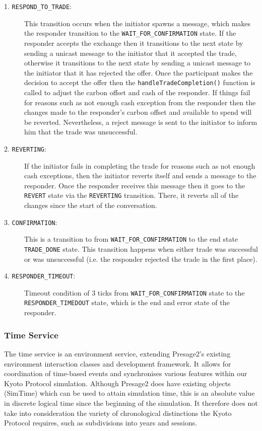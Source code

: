 \begin{description}
	\item[1. \texttt{RESPOND\_TO\_TRADE}:]
	This transition occurs when the initiator spawns a message, which makes the responder transition to the \texttt{WAIT\_FOR\_CONFIRMATION} state. If the responder accepts the exchange then it transitions to the next state by sending a unicast message to the initiator that it accepted the trade, otherwise it transitions to the next state by sending a unicast message to the initiator that it has rejected the offer. Once the participant makes the decision to accept the offer then the \texttt{handleTradeCompletion()} function is called to adjust the carbon offset and cash of the responder. If things fail for reasons such as not enough cash exception from the responder then the changes made to the responder’s carbon offset and available to spend will be reverted. Nevertheless, a reject message is sent to the initiator to inform him that the trade was unsuccessful.
	\item[2. \texttt{REVERTING}:]
	If the initiator fails in completing the trade for reasons such as not enough cash exceptions, then the initiator reverts itself and sends a message to the responder. Once the responder receives this message then it goes to the \texttt{REVERT} state via the \texttt{REVERTING} transition. There, it reverts all of the changes since the start of the conversation.
	\item[3. \texttt{CONFIRMATION}:]
	This is a transition to from \texttt{WAIT\_FOR\_CONFIRMATION} to the end state \texttt{TRADE\_DONE} state. This transition happens when either trade was successful or was unsuccessful (i.e. the responder rejected the trade in the first place).
	\item[4. \texttt{RESPONDER\_TIMEOUT}:]
	Timeout condition of 3 ticks from \texttt{WAIT\_FOR\_CONFIRMATION} state to the \texttt{RESPONDER\_TIMEDOUT} state, which is the end and error state of the responder.
\end{description}

\subsubsection{Time Service}

The time service is an environment service, extending Presage2's existing environment interaction classes and development framework. It allows for coordination of time-based events and synchronises various features within our Kyoto Protocol simulation. Although Presage2 does have existing objects (SimTime) which can be used to attain simulation time, this is an absolute value in discrete logical time since the beginning of the simulation. It therefore does not take into consideration the variety of chronological distinctions the Kyoto Protocol requires, such as subdivisions into years and sessions.

